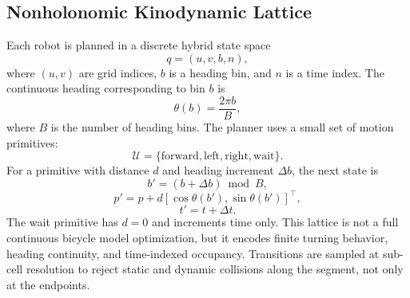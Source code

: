 \documentclass[10pt,twocolumn,letterpaper]{article}
\begin{document}
\subsection{Nonholonomic Kinodynamic Lattice}
Each robot is planned in a discrete hybrid state space
\begin{equation}
    q = (u, v, b, n),
\end{equation}
where $(u,v)$ are grid indices, $b$ is a heading bin, and $n$ is a time index. The continuous heading corresponding to bin $b$ is
\begin{equation}
    \theta(b) = \frac{2\pi b}{B},
\end{equation}
where $B$ is the number of heading bins. The planner uses a small set of motion primitives:
\begin{equation}
    \mathcal{U} = \{\mathrm{forward}, \mathrm{left}, \mathrm{right}, \mathrm{wait}\}.
\end{equation}
For a primitive with distance $d$ and heading increment $\Delta b$, the next state is
\begin{equation}
    b' = (b+\Delta b) \bmod B,
\end{equation}
\begin{equation}
    p' = p + d[\cos\theta(b'), \sin\theta(b')]^\top,
\end{equation}
\begin{equation}
    t' = t + \Delta t.
\end{equation}
The wait primitive has $d=0$ and increments time only. This lattice is not a full continuous bicycle model optimization, but it encodes finite turning behavior, heading continuity, and time-indexed occupancy. Transitions are sampled at sub-cell resolution to reject static and dynamic collisions along the segment, not only at the endpoints.
\end{document}
